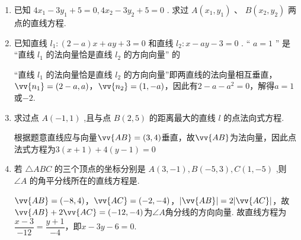 \begin{enumerate}
    \item 已知 $4{x}_{1} - 3{y}_{1} + 5 = 0,4{x}_{2} - 3{y}_{2} + 5 = 0$ . 求过 $A\left( {{x}_{1},{y}_{1}}\right) \text{ 、 }B\left( {{x}_{2},{y}_{2}}\right)$ 两点的直线方程.

    \item 已知直线 ${l}_{1} : \left( {2 - a}\right) x + {ay} + 3 = 0$ 和直线 ${l}_{2} : x - {ay} - 3 = 0$ . “ $a = 1$ ” 是 “直线 ${l}_{1}$ 的法向量恰是直线 ${l}_{2}$ 的方向向量” 的
    \begin{jieda}
        “直线 ${l}_{1}$ 的法向量恰是直线 ${l}_{2}$ 的方向向量”即两直线的法向量相互垂直，$\vv{n_1} = (2-a, a)$，$\vv{n_2} = (1, -a)$，因此有$2-a-a^2 = 0$，解得$a = 1$或$-2$.
    \end{jieda}
    
    \item 求过点 $A\left( {-1,1}\right)$ ,且与点 $B\left( {2,5}\right)$ 的距离最大的直线 $l$ 的点法向式方程.
    \begin{jieda}
        根据题意直线应与向量$\vv{AB} = (3, 4)$垂直，故$\vv{AB}$为法向量，因此点法式方程为$3(x+1)+4(y-1) = 0$
    \end{jieda}
    
    \item 若 $\bigtriangleup {ABC}$ 的三个顶点的坐标分别是 $A\left( {3, - 1}\right) ,B\left( {-5,3}\right) ,C\left( {1, - 5}\right)$ ,则 $\angle A$ 的角平分线所在的直线方程是.
    \begin{jieda}
        $\vv{AB} = (-8, 4)$，$\vv{AC} = (-2, -4)$，$|\vv{AB}| = 2|\vv{AC}|$，故$\vv{AB}+2\vv{AC} = (-12, -4)$为$\angle{A}$角分线的方向向量. 故直线方程为$\dfrac{x-3}{-12} = \dfrac{y+1}{-4}$，即$x-3y-6 = 0$.
    \end{jieda}


\end{enumerate}
